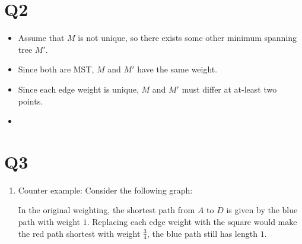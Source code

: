 \documentclass[a4paper, 11pt]{article}
\begin{document}
\begin{multicols*}{2}
	\section*{Q2}

	\begin{itemize}
		\item
		      Assume that $M$ is not unique, so there exists some other minimum spanning tree $M'$.

		\item Since both are MST, $M$ and $M'$ have the same weight.

		\item Since each edge weight is unique, $M$ and $M'$ must differ at at-least two points.

		\item
	\end{itemize}

	\section*{Q3}
	\begin{enumerate}[label=(\alph*)]
		\item Counter example: Consider the following graph:
		      \begin{center}
		      \end{center}
		      In the original weighting, the shortest path from $A$ to $D$ is given by the blue path with weight $1$. Replacing each edge weight with the square would make the red path shortest with weight $\frac 34$, the blue path still has length $1$.


\end{enumerate}
\end{multicols*}
\end{document}
